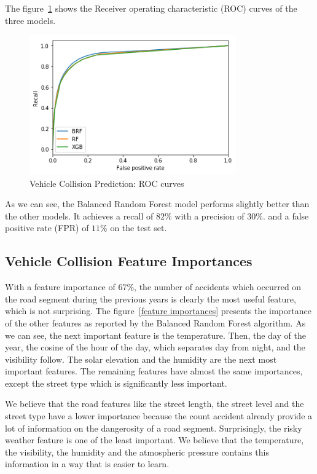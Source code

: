 \documentclass[conference]{IEEEtran}
\begin{document}
The figure~\ref{fig:roc} shows the Receiver operating characteristic (ROC) curves of the three models.

\begin{figure}[htbp]
\centerline{\includegraphics[height=6cm, keepaspectratio]{figures/roc.png}}
\caption{Vehicle Collision Prediction: ROC curves}
\label{fig:roc}
\end{figure}

As we can see, the Balanced Random Forest model performs slightly better than the other models.
It achieves a recall of $82\%$ with a precision of $30\%$. and a false positive rate (FPR) of $11\%$ on the test set.

\subsection{Vehicle Collision Feature Importances}
With a
feature importance of $67\%$, the number of accidents which occurred on the
road segment during the previous years is clearly the most useful feature, which
is not surprising. The figure~\ref{feature importances} presents the
importance of the other features as reported by the Balanced Random Forest
algorithm. As we can see, the next important feature is the temperature. 
Then, the day of the year, the cosine of the hour of the day, which separates day from night,
and the visibility follow. The solar elevation and the humidity are the next most important features. The remaining features have almost the same importances, except the street type which
is significantly less important.

We believe that the road features like the street length, the street level and the street type have a lower importance because the count accident already provide a lot of information on the dangerosity of a road segment. Surprisingly, the risky weather feature is one of the least important. We believe that the temperature, the visibility, the humidity and the atmospheric pressure contains this information in a way that is easier to learn. 
\end{document}
